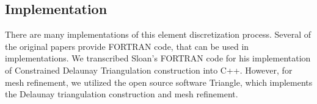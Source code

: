 \documentclass[../fem.tex]{subfiles}
\begin{document}
\subsection{Implementation}%
\label{sub:implementation}

There are many implementations of this element discretization process. Several
of the original papers provide FORTRAN code, that can be used in
implementations. We transcribed Sloan's FORTRAN code for his implementation of
Constrained Delaunay Triangulation construction into C++. However, for mesh
refinement, we utilized the open source software Triangle\cite{T_SOF}, which
implements the Delaunay triangulation construction and mesh refinement.

\end{document}
